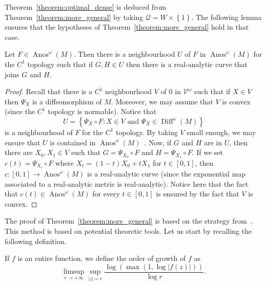 \documentclass[AHL,Unicode,longabstracts,published]{cedram}
\DeclareMathOperator{\Diff}{Diff}
\DeclareMathOperator{\Anos}{Anos}
\newcommand{\set}[1]{\left\{ #1 \right\}}
\newcommand{\va}[1]{\left|#1\right|}
\newcommand{\clV}{\mathcal{V}}
\newcommand{\clQ}{\mathcal{Q}}
\begin{document}
Theorem~\ref{theorem:optimal_dense} is deduced from Theorem~\ref{theorem:more_general} by taking $\clQ = W \times \set{1}$. The following lemma ensures that the hypotheses of Theorem~\ref{theorem:more_general} hold in that case.

\begin{lemm}
Let $F \in \Anos^\omega(M)$. Then there is a neighbourhood $U$ of $F$ in $\Anos^\omega(M)$ for the $C^1$ topology such that if $G,H \in U$ then there is a real-analytic curve that joins $G$ and $H$.
\end{lemm}

\begin{proof}
Recall that there is a $C^1$ neighbourhood $V$ of $0$ in $\clV^\omega$ such that if $X \in V$ then $\Psi_X$ is a diffeomorphism of $M$. Moreover, we may assume that $V$ is convex (since the $C^1$ topology is normable). Notice that
\begin{equation*}
U = \set{ \Psi_X \circ F : X \in V \text{ and } \Psi_X \in \Diff^\omega(M)}
\end{equation*}
is a neighbourhood of $F$ for the $C^1$ topology. By taking $V$ small enough, we may ensure that $U$ is contained in $\Anos^\omega(M)$~\cite{original_anosov}. Now, if $G$ and $H$ are in $U$, then there are $X_0,X_1 \in V$ such that $G = \Psi_{X_0} \circ F$ and $H = \Psi_{X_1} \circ F$. If we set $c(t) = \Psi_{X_t} \circ F$ where $X_t = (1-t)X_0 + t X_1$ for $t \in [0,1]$, then $c: [0,1] \to \Anos^\omega(M)$ is a real-analytic curve (since the exponential map associated to a real-analytic metric is real-analytic). Notice here that the fact that $c(t) \in \Anos^\omega(M)$ for every $t \in [0,1]$ is ensured by the fact that $V$ is convex.
\end{proof}

The proof of Theorem~\ref{theorem:more_general} is based on the strategy from~\cite{christiansen_hyperbolic,bandtlow_naud,
christiansen_schrodinger,christiansen_potential,
christiansen_several,
christiansen_euclidean}. This method is based on potential theoretic tools. Let us start by recalling the following definition.

\begin{defi}
If $f$ is an entire function, we define the order of growth of $f$ as
\begin{equation*}
\limsup_{r \to + \infty} \sup_{\va{z} = r} \frac{\log(\max(1, \log \va{f(z)}))}{\log r}.
\end{equation*}
\end{defi}
\end{document}
